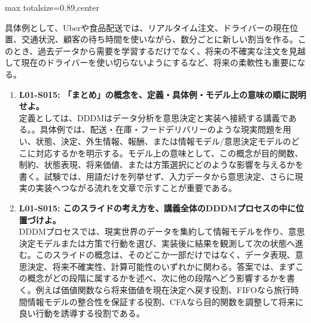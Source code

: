 \begin{minipage}[t]{0.58\textwidth}
\begin{adjustbox}{max totalsize={\textwidth}{0.89\textheight},center}
\begin{minipage}{\textwidth}
具体例として、Uberや食品配送では、リアルタイム注文、ドライバーの現在位置、交通状況、顧客の待ち時間を使いながら、数分ごとに新しい割当を作る。このとき、過去データから需要を学習するだけでなく、将来の不確実な注文を見越して現在のドライバーを使い切らないようにするなど、将来の柔軟性も重要になる。\par{}\begin{enumerate}\item \textbf{L01-S015: 「まとめ」の概念を、定義・具体例・モデル上の意味の順に説明せよ。}\\定義としては、DDDMはデータ分析を意思決定と実装へ接続する講義である。。具体例では、配送・在庫・フードデリバリーのような現実問題を用い、状態、決定、外生情報、報酬、または情報モデル/意思決定モデルのどこに対応するかを明示する。モデル上の意味として、この概念が目的関数、制約、状態表現、将来価値、または方策選択にどのような影響を与えるかを書く。試験では、用語だけを列挙せず、入力データから意思決定、さらに現実の実装へつながる流れを文章で示すことが重要である。\item \textbf{L01-S015: このスライドの考え方を、講義全体のDDDMプロセスの中に位置づけよ。}\\DDDMプロセスでは、現実世界のデータを集約して情報モデルを作り、意思決定モデルまたは方策で行動を選び、実装後に結果を観測して次の状態へ進む。このスライドの概念は、そのどこか一部だけではなく、データ表現、意思決定、将来不確実性、計算可能性のいずれかに関わる。答案では、まずこの概念がどの段階に属するかを述べ、次に他の段階へどう影響するかを書く。例えば価値関数なら将来価値を現在決定へ戻す役割、FIFOなら旅行時間情報モデルの整合性を保証する役割、CFAなら目的関数を調整して将来に良い行動を誘導する役割である。\end{enumerate}
\end{minipage}
\end{adjustbox}
\end{minipage}


